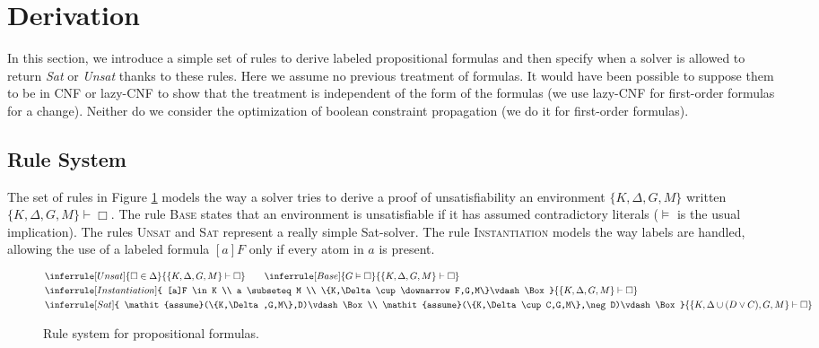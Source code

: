 \documentclass[a4paper,11pt]{article}
\newcommand{\A}{\mathit{assume}}
\begin{document}
\section{Derivation}
In this section, we introduce a simple set of rules to derive labeled propositional formulas and then
specify when a solver is allowed to return \emph{Sat} or \emph{Unsat} thanks to these rules.
Here we assume no previous treatment of formulas. It would have been possible to suppose them to be in
CNF or lazy-CNF to show that the treatment is independent of the form of the formulas
(we use lazy-CNF for first-order formulas for a change). Neither do we
consider the optimization of boolean constraint propagation (we do it for first-order formulas).
\subsection{Rule System}
The set of rules in Figure \ref{p-sr} models the way a solver tries to derive a proof of unsatisfiability
an environment $\{K,\Delta,G,M\}$ written $\{K,\Delta,G,M\}\vdash\Box$. The rule \textsc{Base} states that
an environment is unsatisfiable if it has assumed contradictory literals ($\vDash$ is the usual
implication). The rules \textsc{Unsat} and
\textsc{Sat} represent a really simple Sat-solver. The rule \textsc{Instantiation} models the way labels
are handled, allowing the use of a labeled formula $[a]F$ only if every atom in $a$ is present.

\begin{figure}
\begin{eqnarray*}
&
\inferrule [Unsat]{
\Box\in \Delta
}{
\{K,\Delta,G,M\}\vdash\Box
}\qquad
\inferrule [Base]{
G\vDash\Box
}{
\{K,\Delta,G,M\}\vdash\Box
}\\
&
\inferrule [Instantiation]{
[a]F \in K  \\ a \subseteq M \\ \{K,\Delta\cup\downarrow F,G,M\}\vdash\Box
}{
\{K,\Delta,G,M\}\vdash\Box
}\\
&
\inferrule [Sat]{
\A(\{K,\Delta,G,M\},D)\vdash\Box\\ \A(\{K,\Delta\cup C,G,M\},\neg D)\vdash\Box
}{
\{K,\Delta\cup(D\vee C),G,M\}\vdash\Box
}
\end{eqnarray*}
\caption{\label{p-sr} Rule system for propositional formulas.}
\end{figure}
\end{document}
